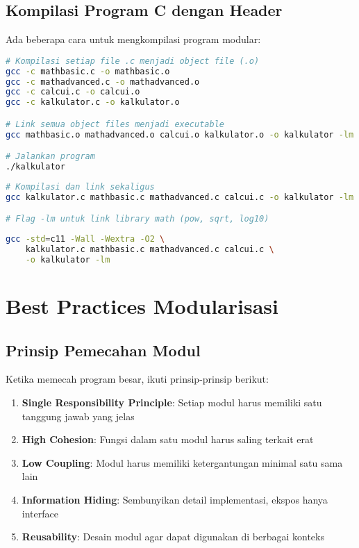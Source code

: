 \documentclass[../main.tex]{subfiles}
\begin{document}
\subsection{Kompilasi Program C dengan Header}
Ada beberapa cara untuk mengkompilasi program modular:

\begin{lstlisting}[language=bash, caption={Kompilasi manual step-by-step}]
# Kompilasi setiap file .c menjadi object file (.o)
gcc -c mathbasic.c -o mathbasic.o
gcc -c mathadvanced.c -o mathadvanced.o
gcc -c calcui.c -o calcui.o
gcc -c kalkulator.c -o kalkulator.o

# Link semua object files menjadi executable
gcc mathbasic.o mathadvanced.o calcui.o kalkulator.o -o kalkulator -lm

# Jalankan program
./kalkulator
\end{lstlisting}

\begin{lstlisting}[language=bash, caption={Kompilasi langsung (satu perintah)}]
# Kompilasi dan link sekaligus
gcc kalkulator.c mathbasic.c mathadvanced.c calcui.c -o kalkulator -lm

# Flag -lm untuk link library math (pow, sqrt, log10)
\end{lstlisting}

\begin{lstlisting}[language=bash, caption={Dengan optimasi dan warning}]
gcc -std=c11 -Wall -Wextra -O2 \
    kalkulator.c mathbasic.c mathadvanced.c calcui.c \
    -o kalkulator -lm
\end{lstlisting}

\section{Best Practices Modularisasi}

\subsection{Prinsip Pemecahan Modul}

Ketika memecah program besar, ikuti prinsip-prinsip berikut:

\begin{enumerate}
  \item \textbf{Single Responsibility Principle}: Setiap modul harus memiliki satu tanggung jawab yang jelas
  \item \textbf{High Cohesion}: Fungsi dalam satu modul harus saling terkait erat
  \item \textbf{Low Coupling}: Modul harus memiliki ketergantungan minimal satu sama lain
  \item \textbf{Information Hiding}: Sembunyikan detail implementasi, ekspos hanya interface
  \item \textbf{Reusability}: Desain modul agar dapat digunakan di berbagai konteks
\end{enumerate}
\end{document}
